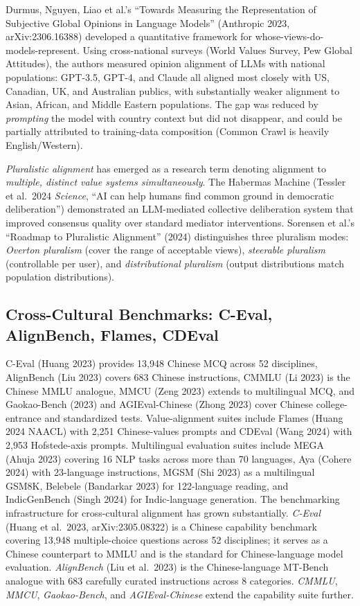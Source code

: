 Durmus, Nguyen, Liao et al.'s ``Towards Measuring the Representation of Subjective Global Opinions in Language Models'' (Anthropic 2023, arXiv:2306.16388) developed a quantitative framework for whose-views-do-models-represent. Using cross-national surveys (World Values Survey, Pew Global Attitudes), the authors measured opinion alignment of LLMs with national populations: GPT-3.5, GPT-4, and Claude all aligned most closely with US, Canadian, UK, and Australian publics, with substantially weaker alignment to Asian, African, and Middle Eastern populations. The gap was reduced by \emph{prompting} the model with country context but did not disappear, and could be partially attributed to training-data composition (Common Crawl is heavily English/Western).

\emph{Pluralistic alignment} has emerged as a research term denoting alignment to \emph{multiple, distinct value systems simultaneously}. The Habermas Machine (Tessler et al.~2024 \emph{Science}, ``AI can help humans find common ground in democratic deliberation'') demonstrated an LLM-mediated collective deliberation system that improved consensus quality over standard mediator interventions. Sorensen et al.'s ``Roadmap to Pluralistic Alignment'' (2024) distinguishes three pluralism modes: \emph{Overton pluralism} (cover the range of acceptable views), \emph{steerable pluralism} (controllable per user), and \emph{distributional pluralism} (output distributions match population distributions).

\subsection{Cross-Cultural Benchmarks: C-Eval, AlignBench, Flames, CDEval}\label{cross-cultural-benchmarks-c-eval-alignbench-flames-cdeval}

C-Eval (Huang 2023) provides 13,948 Chinese MCQ across 52 disciplines, AlignBench (Liu 2023) covers 683 Chinese instructions, CMMLU (Li 2023) is the Chinese MMLU analogue, MMCU (Zeng 2023) extends to multilingual MCQ, and Gaokao-Bench (2023) and AGIEval-Chinese (Zhong 2023) cover Chinese college-entrance and standardized tests. Value-alignment suites include Flames (Huang 2024 NAACL) with 2,251 Chinese-values prompts and CDEval (Wang 2024) with 2,953 Hofstede-axis prompts. Multilingual evaluation suites include MEGA (Ahuja 2023) covering 16 NLP tasks across more than 70 languages, Aya (Cohere 2024) with 23-language instructions, MGSM (Shi 2023) as a multilingual GSM8K, Belebele (Bandarkar 2023) for 122-language reading, and IndicGenBench (Singh 2024) for Indic-language generation. The benchmarking infrastructure for cross-cultural alignment has grown substantially. \emph{C-Eval} (Huang et al.~2023, arXiv:2305.08322) is a Chinese capability benchmark covering 13,948 multiple-choice questions across 52 disciplines; it serves as a Chinese counterpart to MMLU and is the standard for Chinese-language model evaluation. \emph{AlignBench} (Liu et al.~2023) is the Chinese-language MT-Bench analogue with 683 carefully curated instructions across 8 categories. \emph{CMMLU}, \emph{MMCU}, \emph{Gaokao-Bench}, and \emph{AGIEval-Chinese} extend the capability suite further.

